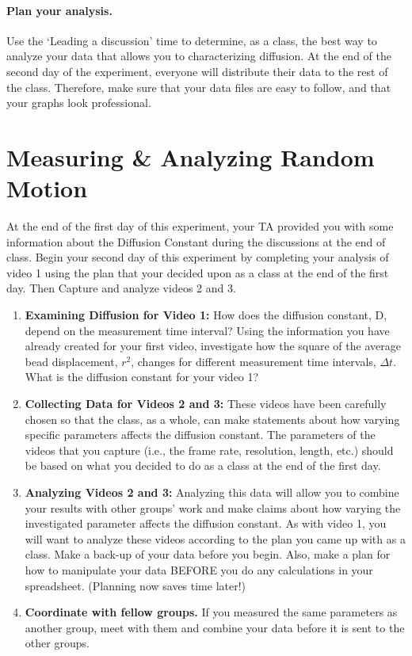 \paragraph*{Plan your analysis.} Use the `Leading a discussion' time to determine, as a class, the best way to analyze your data that allows you to characterizing diffusion.
At the end of the second day of the experiment,  everyone will distribute their data to the rest of the class.
Therefore, make sure that your data files are easy to follow, and that your graphs look professional.

\section{Measuring \& Analyzing Random Motion}
At the end of the first day of this experiment, your TA provided you with some information about the Diffusion Constant during the discussions at the end of class. Begin your second day of this experiment by completing your analysis of video 1 using the plan that your decided upon as a class at the end of the first day. Then Capture and analyze videos 2 and 3.
\begin{enumerate}
\item \textbf{Examining Diffusion for Video 1:} How does the diffusion constant, D, depend on the measurement time interval? Using the information you have already created for your first video, investigate how the square of the average bead displacement, $r^{2}$, changes for different measurement time intervals, $\Delta t$. What is the diffusion constant for your video 1?
\item \textbf{Collecting Data for Videos 2 and 3:} These videos have been carefully chosen so that the class, as a whole, can make statements about how varying specific parameters affects the diffusion constant. The parameters of the videos that you capture (i.e., the frame rate, resolution, length, etc.) should be based on what you decided to do as a class at the end of the first day. 
\item \textbf{Analyzing Videos 2 and 3:} Analyzing this data will allow you to combine your results with other groups' work and make claims about how varying the investigated parameter affects the diffusion constant. As with video 1, you will want to analyze these videos according to the plan you came up with as a class. Make a back-up of your data before you begin. Also, make a plan for how to manipulate your data BEFORE you do any calculations in your spreadsheet. (Planning now saves time later!)
\item \textbf{Coordinate with fellow groups.} If you measured the same parameters as another group, meet with them and combine your data before it is sent to the other groups.
\end{enumerate}

